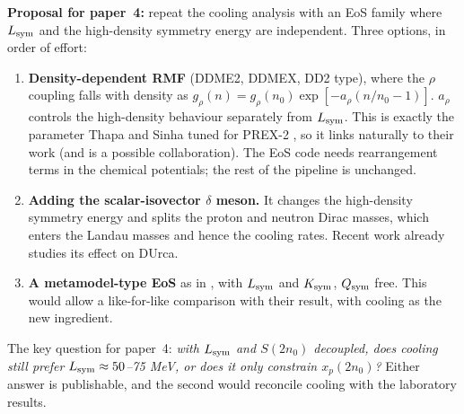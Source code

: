 \documentclass[11pt,a4paper]{article}
\newcommand{\Lsym}{L_{\rm sym}}
\begin{document}
\textbf{Proposal for paper~4:} repeat the cooling analysis with an EoS family where $\Lsym$ and the high-density symmetry energy are independent. Three options, in order of effort:
\begin{enumerate}[leftmargin=*]
\item \textbf{Density-dependent RMF} (DDME2, DDMEX, DD2 type), where the $\rho$ coupling falls with density as $g_\rho(n)=g_\rho(n_0)\exp[-a_\rho(n/n_0-1)]$. $a_\rho$ controls the high-density behaviour separately from $\Lsym$. This is exactly the parameter Thapa and Sinha tuned for PREX-2 \cite{ThapaSinha2022}, so it links naturally to their work (and is a possible collaboration). The EoS code needs rearrangement terms in the chemical potentials; the rest of the pipeline is unchanged.
\item \textbf{Adding the scalar-isovector $\delta$ meson.} It changes the high-density symmetry energy and splits the proton and neutron Dirac masses, which enters the Landau masses and hence the cooling rates. Recent work already studies its effect on DUrca.
\item \textbf{A metamodel-type EoS} as in \cite{Montefusco2026}, with $\Lsym$ and $K_{\rm sym}$, $Q_{\rm sym}$ free. This would allow a like-for-like comparison with their result, with cooling as the new ingredient.
\end{enumerate}
The key question for paper~4: \emph{with $\Lsym$ and $S(2n_0)$ decoupled, does cooling still prefer $\Lsym\approx50$--75 MeV, or does it only constrain $x_p(2n_0)$?} Either answer is publishable, and the second would reconcile cooling with the laboratory results.

\end{document}
